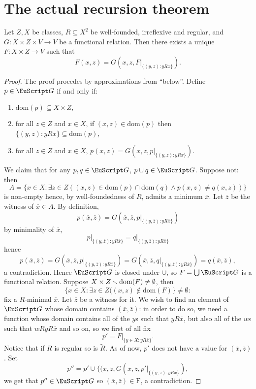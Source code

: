 \documentclass[twoside,openright,titlepage,numbers=noenddot,%
               headinclude,footinclude,cleardoublepage=empty,abstract=on,
               BCOR=23mm,paper=letter,fontsize=11pt
               ]{scrreprt}
\begin{document}
\section{The actual recursion theorem}
\begin{theorem}
    Let $Z,X$ be classes, $R \subseteq X^2$ be well-founded, irreflexive and regular, and $G: X \times Z \times V \to V$ be a functional relation. Then there exists a unique $F: X \times Z \to V$ such that
    \[ F(x,z) = G(x,z, F\vert_{\{(y,z): y R x\}}). \]
\end{theorem}
\begin{proof}
    The proof procedes by approximations from ``below''. Define $p \in \G$ if and only if:
    \begin{enumerate}
        \item $\mathrm{dom}(p) \subseteq X \times Z,$
        \item for all $z \in Z$ and $x \in X$, if $(x,z) \in \mathrm{dom}(p)$ then $\{ (y,z): y R x \} \subseteq \mathrm{dom}(p)$,
        \item for all $z \in Z$ and $x \in X$, $p(x,z) = G(x,z, p\vert_{\{(y,z): y R x\}})$.
    \end{enumerate}
    We claim that for any $p, q \in \G$, $p \cup q \in \G$. Suppose not: then
    \[A = \{ x \in X: \exists z \in Z((x,z) \in \mathrm{dom}(p) \cap \mathrm{dom}(q) \land p(x,z) \neq q(x,z))\} \]
    is non-empty hence, by well-foundedness of $R$, admits a minimum $\overline{x}$. Let $\overline{z}$ be the witness of $\overline{x} \in A$. By definition,
    \[ p(\overline{x},\overline{z}) = G(\overline{x},\overline{z}, p\vert_{\{(y,\overline{z}): y R \overline{x}\}}) \]
    by minimality of $\overline{x}$, 
    \[p\vert_{\{(y,\overline{z}): y R \overline{x}\}} = q\vert_{\{(y,\overline{z}): y R \overline{x}\}}\]
    hence
    \[ p(\overline{x},\overline{z}) = G(\overline{x},\overline{z}, p\vert_{\{(y,\overline{z}): y R \overline{x}\}}) = G(\overline{x},\overline{z}, q\vert_{\{(y,\overline{z}): y R \overline{x}\}}) = q(\overline{x},\overline{z}),\]
    a contradiction. Hence $\G$ is closed under $\cup$, so $F = \bigcup \G$ is a functional relation. Suppose $X \times Z \smallsetminus \mathrm{dom}(F) \neq \emptyset$, then
    \[ \{x \in X: \exists z \in Z((x,z) \notin \mathrm{dom}(F)\} \neq \emptyset:\]
    fix a $R$-minimal $\overline{x}$. Let $\overline{z}$ be a witness for it. We wish to find an element of $\G$ whose domain contains $(\overline{x},\overline{z})$: in order to do so, we need a function whose domain contains all of the $y$s such that $y R \overline{x}$, but also all of the $w$s such that $w R y R \overline{x}$ and so on, so we first of all fix
    \[ p' = F\vert_{\{y \in X: y \tilde{R} \overline{x}\}}.\]
    Notice that if $R$ is regular so is $\tilde{R}$. As of now, $p'$ does not have a value for $(\overline{x},\overline{z})$. Set
    \[ p'' = p' \cup \{(\overline{x},\overline{z},G(\overline{x},\overline{z},p'\vert_{\{(y,\overline{z}): y R \overline{x} \}}), \]
    we get that $p'' \in \G$ so $(\overline{x},\overline{z}) \in \mathrm{F}$, a contradiction.
\end{proof}
\end{document}
